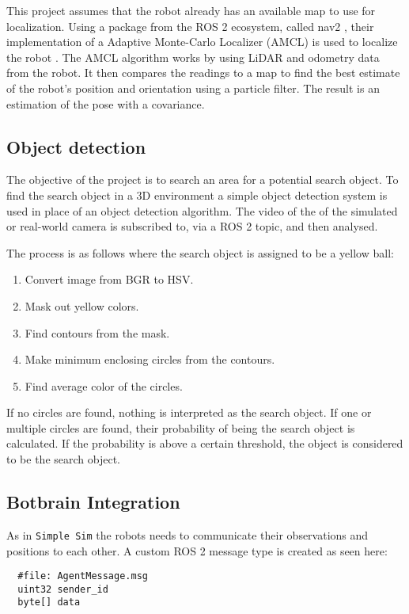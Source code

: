This project assumes that the robot already has an available map to use for localization. 
Using a package from the ROS 2 ecosystem, called nav2 \cite{nav2}, their implementation of a Adaptive Monte-Carlo Localizer (AMCL) is used to localize the robot \cite{amcl}.
The AMCL algorithm works by using LiDAR and odometry data from the robot. It then compares the readings to a map to find the best estimate of the robot's position and orientation using a particle filter. The result is an estimation of the pose with a covariance.

\subsection{Object detection}\label{sub:object_detection}
The objective of the project is to search an area for a potential search object.
To find the search object in a 3D environment a simple object detection system is used in place of an object detection algorithm. The video of the of the simulated or real-world camera is subscribed to, via a ROS 2 topic, and then analysed. 

The process is as follows where the search object is assigned to be a yellow ball:
\begin{enumerate}
  \item Convert image from BGR to HSV.
  \item Mask out yellow colors. 
  \item Find contours from the mask.
  \item Make minimum enclosing circles from the contours.
  \item Find average color of the circles.
\end{enumerate}

If no circles are found, nothing is interpreted as the search object. If one or multiple circles are found, their probability of being the search object is calculated.
If the probability is above a certain threshold, the object is considered to be the search object.

\subsection{Botbrain Integration}\label{sub:Botbrain_integration}
As in \texttt{Simple Sim} the robots needs to communicate their observations and positions to each other. A custom ROS 2 message type is created as seen here:
\begin{verbatim}
  #file: AgentMessage.msg
  uint32 sender_id
  byte[] data
\end{verbatim}

